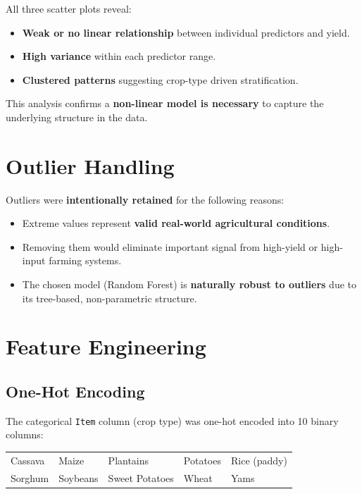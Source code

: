 \documentclass[12pt,a4paper]{article}
\begin{document}
All three scatter plots reveal:
\begin{itemize}[leftmargin=2em]
  \item \textbf{Weak or no linear relationship} between individual predictors and yield.
  \item \textbf{High variance} within each predictor range.
  \item \textbf{Clustered patterns} suggesting crop-type driven stratification.
\end{itemize}

This analysis confirms a \textbf{non-linear model is necessary} to capture the
underlying structure in the data.

\section{Outlier Handling}

Outliers were \textbf{intentionally retained} for the following reasons:

\begin{itemize}[leftmargin=2em]
  \item Extreme values represent \textbf{valid real-world agricultural conditions}.
  \item Removing them would eliminate important signal from high-yield
        or high-input farming systems.
  \item The chosen model (Random Forest) is \textbf{naturally robust to outliers}
        due to its tree-based, non-parametric structure.
\end{itemize}

\section{Feature Engineering}

\subsection{One-Hot Encoding}
The categorical \texttt{Item} column (crop type) was one-hot encoded into
10 binary columns:

\begin{center}
\small\renewcommand{\arraystretch}{1.2}
\begin{tabular}{lllll}
\hline
Cassava & Maize & Plantains & Potatoes & Rice (paddy) \\
Sorghum & Soybeans & Sweet Potatoes & Wheat & Yams \\
\hline
\end{tabular}
\end{center}
\end{document}
